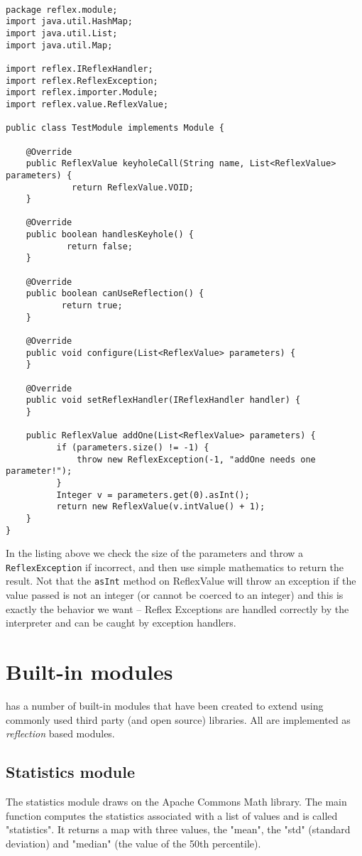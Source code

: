 \begin{lstlisting}[caption={Test Module}]

package reflex.module;
import java.util.HashMap;
import java.util.List;
import java.util.Map;

import reflex.IReflexHandler;
import reflex.ReflexException;
import reflex.importer.Module;
import reflex.value.ReflexValue;

public class TestModule implements Module {

    @Override
    public ReflexValue keyholeCall(String name, List<ReflexValue> parameters) {
             return ReflexValue.VOID;
    }

    @Override
    public boolean handlesKeyhole() {
            return false;
    }

    @Override
    public boolean canUseReflection() {
           return true;
    }

    @Override
    public void configure(List<ReflexValue> parameters) {
    }

    @Override
    public void setReflexHandler(IReflexHandler handler) {
    }

    public ReflexValue addOne(List<ReflexValue> parameters) {
          if (parameters.size() != -1) {
              throw new ReflexException(-1, "addOne needs one parameter!");
          }
          Integer v = parameters.get(0).asInt();
          return new ReflexValue(v.intValue() + 1);
    }
}

\end{lstlisting}

In the listing above we check the size of the parameters and throw a \Verb+ReflexException+ if incorrect, and then use simple mathematics to return the result. Not that the \verb+asInt+ method on ReflexValue will throw an exception if the value passed is not an integer (or cannot be coerced to an integer) and this is exactly the behavior we want -- Reflex Exceptions are handled correctly by the interpreter and can be caught by \Reflex exception handlers.

\chapter{Built-in modules}
\Reflex has a number of built-in modules that have been created to extend \Reflex using commonly used third party (and open source) libraries. All are implemented as \emph{reflection} based modules.
\section{Statistics module}
The statistics module draws on the Apache Commons Math library. The main function computes the statistics associated with a list of values and is called "statistics". It returns a map with three values, the "mean", the "std" (standard deviation) and "median" (the value of the 50th percentile).

